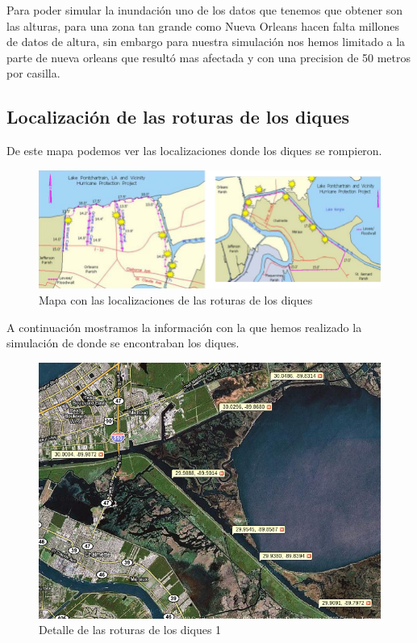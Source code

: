 Para poder simular la inundación uno de los datos que tenemos que obtener son
las alturas, para una zona tan grande como Nueva Orleans hacen falta millones
de datos de altura, sin embargo para nuestra simulación nos hemos limitado a la
parte de nueva orleans que resultó mas afectada y con una precision de 50
metros por casilla.

\subsection*{Localización de las roturas de los diques}

De este mapa podemos ver las localizaciones donde los diques se rompieron.

\begin{figure}[H]
 \centering
 \includegraphics[width=135mm]{figuras/cap6/dikes.png}
 \caption{Mapa con las localizaciones de las roturas de los diques}
\end{figure}

A continuación mostramos la información con la que hemos realizado la
simulación de donde se encontraban los diques.


\begin{figure}[H]
 \centering
 \includegraphics[width=135mm]{figuras/cap6/dikes1.png}
 \caption{Detalle de las roturas de los diques 1}
\end{figure}


